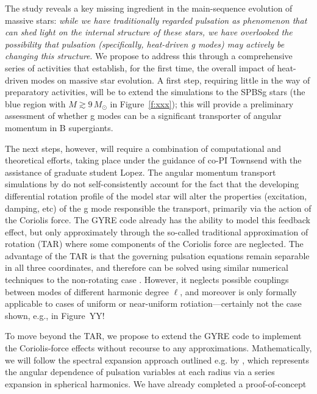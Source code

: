 The \citet{Townsend:2017} study reveals a key missing ingredient in the main-sequence evolution of massive stars: \emph{while we have traditionally regarded pulsation as phenomenon that can shed light on the internal structure of these stars, we have overlooked the possibility that pulsation (specifically, heat-driven g modes) may actively be changing this structure}. We propose to address this through a comprehensive series of activities that establish, for the first time, the overall impact of heat-driven modes on massive star evolution. A first step, requiring little in the way of preparatory activities, will be to extend the \citet{Townsend:2017} simulations to the SPBSg stars (the blue region with $M \gtrsim 9\,M_{\odot}$ in Figure~\ref{f:xxx}); this will provide a preliminary assessment of whether g modes can be a significant transporter of angular momentum in B supergiants.

The next steps, however, will require a combination of computational and theoretical efforts, taking place under the guidance of co-PI Townsend with the assistance of graduate student Lopez. The angular momentum transport simulations by \citet{Townsend:2017} do not self-consistently account for the fact that the developing differential rotation profile of the model star will alter the properties (excitation, damping, etc) of the g mode responsible the transport, primarily via the action of the Coriolis force. The GYRE code already has the ability to model this feedback effect, but only approximately through the so-called traditional approximation of rotation (TAR) where some components of the Coriolis force are neglected. The advantage of the TAR is that the governing pulsation equations remain separable in all three coordinates, and therefore can be solved using similar numerical techniques to the non-rotating case \citep[see, e.g.,][for a demonstration of the TAR applied to rotating SPB stars]{Townsend:2005}. However, it neglects possible couplings between modes of different harmonic degree $\ell$, and moreover is only formally applicable to cases of uniform or near-uniform rotiation---certainly not the case shown, e.g., in Figure~YY!

To move beyond the TAR, we propose to extend the GYRE code to implement the Coriolis-force effects without recourse to any approximations. Mathematically, we will follow the spectral expansion approach outlined e.g. by \citep{Lee:2001}, which represents the angular dependence of pulsation variables at each radius via a series expansion in spherical harmonics. We have already completed a proof-of-concept  